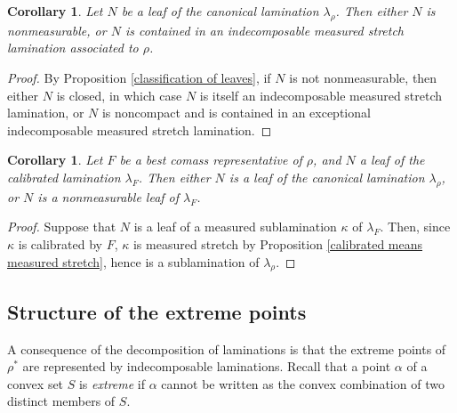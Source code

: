\documentclass[reqno,11pt]{amsart}
\newcommand{\dfn}[1]{\emph{#1}\index{#1}}
\newtheorem{corollary}[theorem]{Corollary}
\theoremstyle{definition}
\numberwithin{equation}{section}
\begin{document}
\begin{corollary}\label{measurable leaves are contained in indecomposables}
Let $N$ be a leaf of the canonical lamination $\lambda_\rho$.
Then either $N$ is nonmeasurable, or $N$ is contained in an indecomposable measured stretch lamination associated to $\rho$.
\end{corollary}
\begin{proof}
By Proposition \ref{classification of leaves}, if $N$ is not nonmeasurable, then either $N$ is closed, in which case $N$ is itself an indecomposable measured stretch lamination, or $N$ is noncompact and is contained in an exceptional indecomposable measured stretch lamination.
\end{proof}

\begin{corollary}
Let $F$ be a best comass representative of $\rho$, and $N$ a leaf of the calibrated lamination $\lambda_F$.
Then either $N$ is a leaf of the canonical lamination $\lambda_\rho$, or $N$ is a nonmeasurable leaf of $\lambda_F$.
\end{corollary}
\begin{proof}
Suppose that $N$ is a leaf of a measured sublamination $\kappa$ of $\lambda_F$.
Then, since $\kappa$ is calibrated by $F$, $\kappa$ is measured stretch by Proposition \ref{calibrated means measured stretch}, hence is a sublamination of $\lambda_\rho$.
\end{proof}

\subsection{Structure of the extreme points}
A consequence of the decomposition of laminations is that the extreme points of $\rho^*$ are represented by indecomposable laminations.
Recall that a point $\alpha$ of a convex set $S$ is \dfn{extreme} if $\alpha$ cannot be written as the convex combination of two distinct members of $S$.
\end{document}
